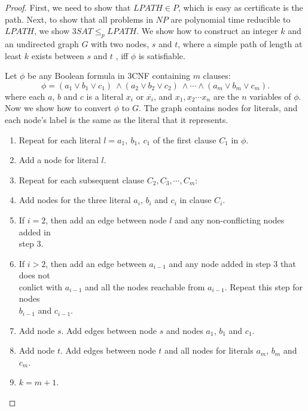 \documentclass[11pt]{article}
\begin{document}
\begin{proof}
First, we need to show that $LPATH \in P$, which is easy as certificate is the path. Next, to show that all problems in $NP$ are polynomial time reducible to $LPATH$, we show $3SAT \leq_p LPATH$. We show how to construct an integer $k$ and an undirected graph $G$ with two nodes, $s$ and $t$, where a simple path of length at least $k$ exists between $s$ and $t$ , iff $\phi$ is satisfiable.

Let $\phi$ be any Boolean formula in 3CNF containing $m$ clauses:
\[
\phi = (a_1 \vee b_1 \vee c_1) \ \wedge (a_2 \vee b_2 \vee c_2) \ \wedge \cdots \wedge (a_m \vee b_m \vee c_m).
\]
where each $a$, $b$ and $c$ is a literal $x_i$ or $\overline{x_i}$, and $x_1, x_2 \cdots x_n$ are the $n$ variables of $\phi$. Now we show how to convert $\phi$ to $G$. The graph contains nodes for literals, and each node's label is the same as the literal that it represents.

\begin{enumerate}
\item Repeat for each literal $l = a_1, \ b_1, \ c_1$ of the first clause $C_1$ in $\phi$.
\item \hspace*{0.5cm} Add a node for literal $l$.
\item \hspace*{0.5cm} Repeat for each subsequent clause $C_2, C_3, \cdots, C_m$:
\item \hspace*{1.2cm} Add nodes for the three literal $a_i$, $b_i$ and $c_i$  in clause $C_i$.
\item \hspace*{1.2cm} If $i = 2$, then add an edge between node $l$ and any non-conflicting nodes added in \\
\hspace*{1.2cm} step 3.
\item \hspace*{1.2cm} If $i > 2$, then add an edge between $a_{i-1}$ and any node added in step 3 that does not \\
\hspace*{1.2cm} conlict with $a_{i-1}$ and all the nodes reachable from $a_{i-1}$. Repeat this step for nodes \\
\hspace*{1.2cm} $b_{i-1}$ and $c_{i-1}$.
\item Add node $s$. Add edges between node $s$ and nodes $a_1$, $b_1$ and $c_1$.
\item Add node $t$. Add edges between node $t$ and all nodes for literals $a_m$, $b_m$ and $c_m$.
\item $k = m + 1$.
\end{enumerate}


\end{proof}
\end{document}
